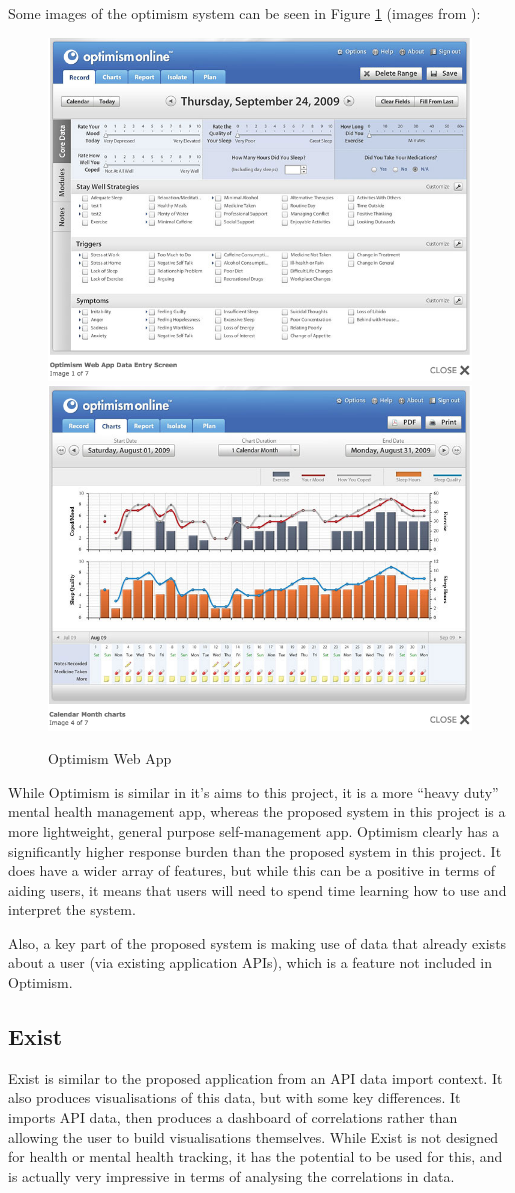\documentclass[11pt,openright,a4paper]{report}
\begin{document}
\newpage
Some images of the optimism system can be seen in Figure \ref{fig:optimism} (images from \parencite{optimism}):
\begin{figure}[ht]
\centering
\caption{Optimism Web App}
\includegraphics[width=.5\textwidth]{i/optimism1.png}\hfill
\includegraphics[width=.5\textwidth]{i/optimism2.png}
\label{fig:optimism}
\end{figure}

While Optimism is similar in it's aims to this project, it is a more \enquote{heavy duty} mental health management app, whereas the proposed system in this project is a more lightweight, general purpose self-management app. Optimism clearly has a significantly higher response burden than the proposed system in this project. It does have a wider array of features, but while this can be a positive in terms of aiding users, it means that users will need to spend time learning how to use and interpret the system.

Also, a key part of the proposed system is making use of data that already exists about a user (via existing application APIs), which is a feature not included in Optimism.

\subsection{Exist} \label{exist}
Exist \parencite{exist} is similar to the proposed application from an API data import context. It also produces visualisations of this data, but with some key differences. It imports API data, then produces a dashboard of correlations rather than allowing the user to build visualisations themselves. While Exist is not designed for health or mental health tracking, it has the potential to be used for this, and is actually very impressive in terms of analysing the correlations in data.
\end{document}
